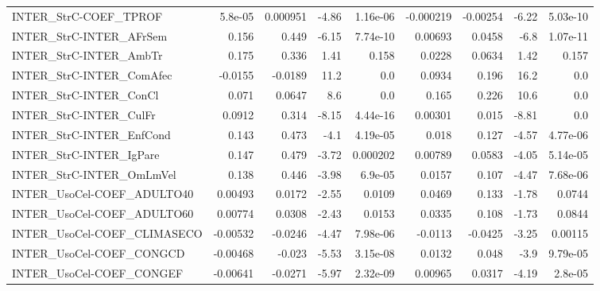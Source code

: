 \begin{tabular}{lrrrrrrrr}
INTER\_StrC-COEF\_TPROF                  &     5.8e-05 &     0.000951 &    -4.86 & 1.16e-06 &  -0.000219 &    -0.00254 &        -6.22 &      5.03e-10 \\
INTER\_StrC-INTER\_AFrSem                &       0.156 &        0.449 &    -6.15 & 7.74e-10 &    0.00693 &      0.0458 &         -6.8 &      1.07e-11 \\
INTER\_StrC-INTER\_AmbTr                 &       0.175 &        0.336 &     1.41 &    0.158 &     0.0228 &      0.0634 &         1.42 &         0.157 \\
INTER\_StrC-INTER\_ComAfec               &     -0.0155 &      -0.0189 &     11.2 &      0.0 &     0.0934 &       0.196 &         16.2 &           0.0 \\
INTER\_StrC-INTER\_ConCl                 &       0.071 &       0.0647 &      8.6 &      0.0 &      0.165 &       0.226 &         10.6 &           0.0 \\
INTER\_StrC-INTER\_CulFr                 &      0.0912 &        0.314 &    -8.15 & 4.44e-16 &    0.00301 &       0.015 &        -8.81 &           0.0 \\
INTER\_StrC-INTER\_EnfCond               &       0.143 &        0.473 &     -4.1 & 4.19e-05 &      0.018 &       0.127 &        -4.57 &      4.77e-06 \\
INTER\_StrC-INTER\_IgPare                &       0.147 &        0.479 &    -3.72 & 0.000202 &    0.00789 &      0.0583 &        -4.05 &      5.14e-05 \\
INTER\_StrC-INTER\_OmLmVel               &       0.138 &        0.446 &    -3.98 &  6.9e-05 &     0.0157 &       0.107 &        -4.47 &      7.68e-06 \\
INTER\_UsoCel-COEF\_ADULTO40             &     0.00493 &       0.0172 &    -2.55 &   0.0109 &     0.0469 &       0.133 &        -1.78 &        0.0744 \\
INTER\_UsoCel-COEF\_ADULTO60             &     0.00774 &       0.0308 &    -2.43 &   0.0153 &     0.0335 &       0.108 &        -1.73 &        0.0844 \\
INTER\_UsoCel-COEF\_CLIMASECO            &    -0.00532 &      -0.0246 &    -4.47 & 7.98e-06 &    -0.0113 &     -0.0425 &        -3.25 &       0.00115 \\
INTER\_UsoCel-COEF\_CONGCD               &    -0.00468 &       -0.023 &    -5.53 & 3.15e-08 &     0.0132 &       0.048 &         -3.9 &      9.79e-05 \\
INTER\_UsoCel-COEF\_CONGEF               &    -0.00641 &      -0.0271 &    -5.97 & 2.32e-09 &    0.00965 &      0.0317 &        -4.19 &       2.8e-05 \\

\end{tabular}
